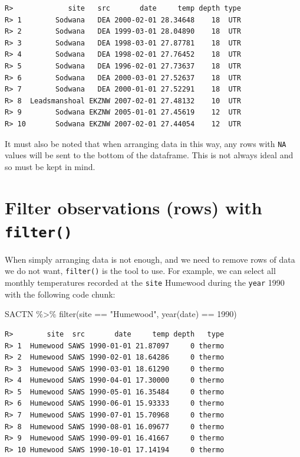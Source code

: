 \documentclass[
]{book}
\newenvironment{Shaded}{\begin{snugshade}}{\end{snugshade}}
\newcommand{\DecValTok}[1]{\textcolor[rgb]{0.00,0.00,0.81}{#1}}
\newcommand{\FunctionTok}[1]{\textcolor[rgb]{0.00,0.00,0.00}{#1}}
\newcommand{\NormalTok}[1]{#1}
\newcommand{\SpecialCharTok}[1]{\textcolor[rgb]{0.00,0.00,0.00}{#1}}
\newcommand{\StringTok}[1]{\textcolor[rgb]{0.31,0.60,0.02}{#1}}
\begin{document}
\begin{verbatim}
R>             site   src       date     temp depth type
R> 1        Sodwana   DEA 2000-02-01 28.34648    18  UTR
R> 2        Sodwana   DEA 1999-03-01 28.04890    18  UTR
R> 3        Sodwana   DEA 1998-03-01 27.87781    18  UTR
R> 4        Sodwana   DEA 1998-02-01 27.76452    18  UTR
R> 5        Sodwana   DEA 1996-02-01 27.73637    18  UTR
R> 6        Sodwana   DEA 2000-03-01 27.52637    18  UTR
R> 7        Sodwana   DEA 2000-01-01 27.52291    18  UTR
R> 8  Leadsmanshoal EKZNW 2007-02-01 27.48132    10  UTR
R> 9        Sodwana EKZNW 2005-01-01 27.45619    12  UTR
R> 10       Sodwana EKZNW 2007-02-01 27.44054    12  UTR
\end{verbatim}

It must also be noted that when arranging data in this way, any rows with \texttt{NA} values will be sent to the bottom of the dataframe. This is not always ideal and so must be kept in mind.

\hypertarget{filter-observations-rows-with-filter}{%
\section{\texorpdfstring{Filter observations (rows) with \texttt{filter()}}{Filter observations (rows) with filter()}}\label{filter-observations-rows-with-filter}}

When simply arranging data is not enough, and we need to remove rows of data we do not want, \texttt{filter()} is the tool to use. For example, we can select all monthly temperatures recorded at the \texttt{site} Humewood during the \texttt{year} 1990 with the following code chunk:

\begin{Shaded}
\begin{Highlighting}[]
\NormalTok{SACTN }\SpecialCharTok{\%\textgreater{}\%} 
  \FunctionTok{filter}\NormalTok{(site }\SpecialCharTok{==} \StringTok{"Humewood"}\NormalTok{, }\FunctionTok{year}\NormalTok{(date) }\SpecialCharTok{==} \DecValTok{1990}\NormalTok{)}
\end{Highlighting}
\end{Shaded}

\begin{verbatim}
R>        site  src       date     temp depth   type
R> 1  Humewood SAWS 1990-01-01 21.87097     0 thermo
R> 2  Humewood SAWS 1990-02-01 18.64286     0 thermo
R> 3  Humewood SAWS 1990-03-01 18.61290     0 thermo
R> 4  Humewood SAWS 1990-04-01 17.30000     0 thermo
R> 5  Humewood SAWS 1990-05-01 16.35484     0 thermo
R> 6  Humewood SAWS 1990-06-01 15.93333     0 thermo
R> 7  Humewood SAWS 1990-07-01 15.70968     0 thermo
R> 8  Humewood SAWS 1990-08-01 16.09677     0 thermo
R> 9  Humewood SAWS 1990-09-01 16.41667     0 thermo
R> 10 Humewood SAWS 1990-10-01 17.14194     0 thermo
\end{verbatim}
\end{document}
